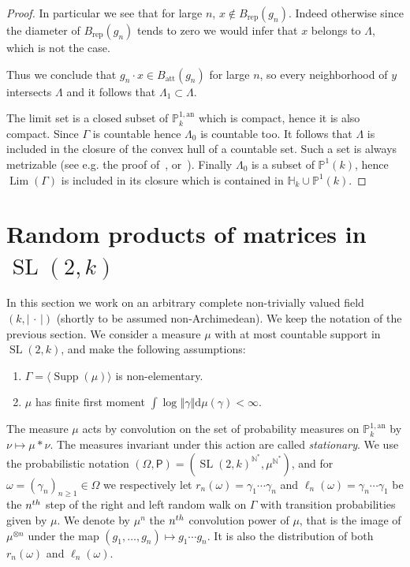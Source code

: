\documentclass[11pt]{article}
\theoremstyle{definition}
\numberwithin{equation}{section}
\numberwithin{figure}{section}
\numberwithin{table}{section}
\DeclareMathOperator{\supp}{Supp}
\DeclareMathOperator{\Lm}{Lim}
\DeclareMathOperator{\SL}{SL}
\newcommand{\nn}{\mathbb{N}}
\newcommand{\hh}{\mathbb{H}}
\newcommand{\prob}{\mathsf{P}}
\newcommand{\an}{\mathrm{an}}
\newcommand{\om}{\Omega}
\newcommand{\norm}[1]{\left\Vert#1\right\Vert}
\newcommand{\abs}[1]{\left\vert#1\right\vert}
\newcommand{\PP}{\mathbb{P}}
\newcommand{\berk}{{\mathbb{P}^{1, \mathrm{an}}_k}}
\newcommand{\att}{\mathrm{att}}
\newcommand{\rep}{\mathrm{rep}}
\newcommand{\SLk}{\SL(2,k)}
\newcommand*{\dd}{\mathrm{d}}
\newcommand*{\dmu}{\dd \mu}
\begin{document}
\begin{proof}
In particular we see that for large $n$, $x\notin B_{\rep}(g_n)$. Indeed otherwise since the diameter of $B_{\rep}(g_n)$ tends to zero we would infer that $x$ belongs to $\Lambda$, which is not the case.

Thus we conclude that $g_n\cdot x\in B_{\att}(g_n)$ for large $n$, so every neighborhood of $y$ intersects $\Lambda$ and it follows that $\Lambda_1\subset\Lambda$.


The limit set is a closed subset of $\PP^{1,\an}_k$ which is compact, hence it is also compact. Since $\Gamma$ is countable hence $\Lambda_0$ is countable too. It follows that $\Lambda$ is included in the closure of the convex hull of a countable set. Such a set is always metrizable (see e.g. the proof of~\cite[Lem.~7.15]{valtree}, or~\cite[Lem.~5.7]{baker-rumely}). Finally $\Lambda_0$ is a subset of $\PP^1(k)$, hence $\Lm(\Gamma)$ is included in its closure which is contained in $\hh_k \cup \PP^1(k)$.
\end{proof}


\section{Random products of matrices in \texorpdfstring{$\SLk$}{SLk}}\label{sec:furstenberg}

In this section we work on an arbitrary complete non-trivially valued field $(k, \abs{{\,\cdot\,}})$ (shortly to be assumed non-Archimedean). We keep the notation of the previous section. We consider a measure $\mu$ with at most countable support in $\SLk$, and make the following assumptions:
\begin{enumerate}\renewcommand{\theenumi}{B\arabic{enumi}}
\item \label{B1} $\Gamma = \langle \supp(\mu) \rangle$ is non-elementary.
\item \label{B2} $\mu$ has finite first moment $ \int \log \norm{\gamma} \dmu(\gamma)<\infty$.
\end{enumerate}

The measure $\mu$ acts by convolution on the set of probability measures on $\berk$ by $\nu \mapsto \mu \ast \nu$. The measures invariant under this action are called \emph{stationary}. We use the probabilistic notation $(\om, \prob) = (\SLk^{\nn^*}, \mu^{\nn^*})$, and for $\omega = (\gamma_n)_{n\geq 1}\in \om$ we respectively let $r_n(\omega) = \gamma_1\cdots \gamma_n$ and $\ell_n(\omega) = \gamma_n\cdots \gamma_1$ be the $n^{\rm th}$ step of the right and left random walk on $\Gamma$ with transition probabilities given by $\mu$. We denote by $\mu^n$ the $n^{\rm th}$ convolution power of $\mu$, that is the image of $\mu^ {\otimes n}$ under the map $(g_1, \ldots,g_n)\mapsto g_1\cdots g_n$. It is also the distribution of both $r_n(\omega)$ and $\ell_n(\omega)$.
\end{document}
